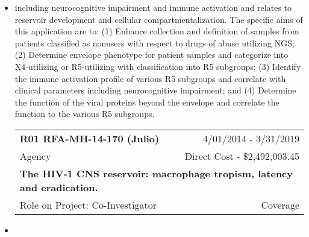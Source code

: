 \documentclass[a4paper,11pt]{article}
\makeatletter
\newenvironment{fullwidth}
    {\par
     \setlength{\@totalleftmargin}{0pt}%
     \setlength{\linewidth}{\hsize}%
     \list{}{\setlength{\leftmargin}{0pt}}
     \item\relax}
    {\endlist}
\makeatother
\begin{document}
\begin{enumerate}
\begin{itemize}
\begin{fullwidth}
including neurocognitive impairment and immune activation and relates to reservoir development and cellular compartmentalization.  The specific aims of this application are to: (1) Enhance collection and definition of samples from patients classified as nonusers with respect to drugs of abuse utilizing NGS; (2) Determine envelope phenotype for patient samples and categorize into X4-utilizing or R5-utilizing with classification into R5 subgroups; (3) Identify the immune activation profile of various R5 subgroups and correlate with clinical parameters including neurocognitive impairment; and (4) Determine the function of the viral proteins beyond the envelope and correlate the function to the various R5 subgroups.
    \end{fullwidth}
  
  \begin{longtable}{lr}
    \textbf{R01 RFA-MH-14-170 (Julio)} & 4/01/2014 - 3/31/2019 \\
    Agency & Direct Cost - \$2,492,003.45  \\
    \multicolumn{2}{p{0.973\textwidth}}{\bfseries The HIV-1 CNS reservoir: macrophage tropism, latency and eradication.} \\
    Role on Project:  Co-Investigator & Coverage \\
    \end{longtable}
    \begin{fullwidth}

\end{fullwidth}
\end{itemize}
\end{enumerate}
\end{document}
